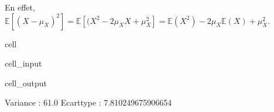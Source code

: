 \documentclass[letterpaper,10pt,english]{jupyterBook}
\begin{document}
\sphinxAtStartPar
En effet, \(\mathbb{E}\left [(X-\mu_X)^2 \right] = \mathbb{E}\left [(X^2-2\mu_XX+\mu_X^2 \right] = \mathbb{E}(X^2)-2\mu_X\mathbb{E}(X)+\mu_X^2\).

\begin{sphinxuseclass}{cell}\begin{sphinxVerbatimInput}

\begin{sphinxuseclass}{cell_input}
\begin{sphinxVerbatim}[commandchars=\\\{\}]
   

  \PYG{p}{[}  \PYG{p}{]}
  \PYG{p}{[}  \PYG{p}{]}
   
 
 
\end{sphinxVerbatim}

\end{sphinxuseclass}\end{sphinxVerbatimInput}
\begin{sphinxVerbatimOutput}

\begin{sphinxuseclass}{cell_output}
\begin{sphinxVerbatim}[commandchars=\\\{\}]
Variance :  61.0
Ecart\PYGZhy{}type :  7.810249675906654
\end{sphinxVerbatim}

\end{sphinxuseclass}\end{sphinxVerbatimOutput}

\end{sphinxuseclass}
\end{document}
